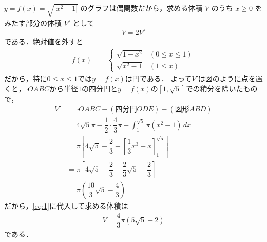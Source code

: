 \documentclass[../../main.tex]{subfiles}
\begin{document}
$y = f(x)=\sqrt{|x^2 - 1|}$ のグラフは偶関数だから，求める体積 $V$ のうち $x \ge 0$ をみたす部分の体積 $V'$ として
\begin{align}
  V = 2 V' \label{eq:1}
\end{align}
である．絶対値を外すと
\begin{align}
  f(x) &=
  \begin{cases}
    \sqrt{1-x^2} & (0 \le x \le 1)\\
    \sqrt{x^2-1} & (1 \le x)
  \end{cases}
\end{align}
だから，特に$0 \le x \le 1$では$y=f(x)$は円である．
よって$V'$は図のように点を置くと，$\square OABC$から半径$1$の四分円と$y=f(x)$の$[1,\sqrt{5}]$での積分を除いたもので，
\begin{align}
  V'
  &= \square OABC - (\text{四分円}ODE) - (\text{図形}ABD) \\
  &= 4 \sqrt{5}\pi - \dfrac{1}{2} \cdot \dfrac{4}{3}\pi - \int_1^{\sqrt{5}} \pi (x^2 - 1) \, dx \\
  &= \pi \left[ 4\sqrt{5} - \dfrac{2}{3} - \left[ \dfrac{1}{3}x^3 - x \right]_1^{\sqrt{5}} \right] \\
  &= \pi \left[ 4\sqrt{5} - \dfrac{2}{3} - \dfrac{2}{3}\sqrt{5} - \dfrac{2}{3} \right] \\
  & = \pi \left( \dfrac{10}{3}\sqrt{5} - \dfrac{4}{3} \right)
\end{align}
だから，\cref{eq:1}に代入して求める体積は
\begin{align}
  V = \dfrac{4}{3}\pi (5\sqrt{5} - 2)
\end{align}
である．

\newpage
\end{document}
